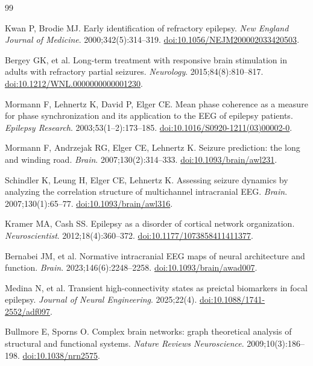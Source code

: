 \documentclass[a4paper,fleqn]{cas-dc}
\begin{document}
\begin{thebibliography}{99}

  Kwan P, Brodie MJ.
  Early identification of refractory epilepsy.
  \textit{New England Journal of Medicine}. 2000;342(5):314--319.
  \href{https://doi.org/10.1056/NEJM200002033420503}{doi:10.1056/NEJM200002033420503}.

  Bergey GK, et al.
  Long-term treatment with responsive brain stimulation in adults with
  refractory partial seizures.
  \textit{Neurology}. 2015;84(8):810--817.
  \href{https://doi.org/10.1212/WNL.0000000000001230}{doi:10.1212/WNL.0000000000001230}.

  Mormann F, Lehnertz K, David P, Elger CE.
  Mean phase coherence as a measure for phase synchronization and its
  application to the EEG of epilepsy patients.
  \textit{Epilepsy Research}. 2003;53(1--2):173--185.
  \href{https://doi.org/10.1016/S0920-1211(03)00002-0}{doi:10.1016/S0920-1211(03)00002-0}.

  Mormann F, Andrzejak RG, Elger CE, Lehnertz K.
  Seizure prediction: the long and winding road.
  \textit{Brain}. 2007;130(2):314--333.
  \href{https://doi.org/10.1093/brain/awl231}{doi:10.1093/brain/awl231}.

  Schindler K, Leung H, Elger CE, Lehnertz K.
  Assessing seizure dynamics by analyzing the correlation structure of
  multichannel intracranial EEG.
  \textit{Brain}. 2007;130(1):65--77.
  \href{https://doi.org/10.1093/brain/awl316}{doi:10.1093/brain/awl316}.

  Kramer MA, Cash SS.
  Epilepsy as a disorder of cortical network organization.
  \textit{Neuroscientist}. 2012;18(4):360--372.
  \href{https://doi.org/10.1177/1073858411411377}{doi:10.1177/1073858411411377}.

  Bernabei JM, et al.
  Normative intracranial EEG maps of neural architecture and function.
  \textit{Brain}. 2023;146(6):2248--2258.
  \href{https://doi.org/10.1093/brain/awad007}{doi:10.1093/brain/awad007}.

  Medina N, et al.
  Transient high-connectivity states as preictal biomarkers in focal
  epilepsy.
  \textit{Journal of Neural Engineering}. 2025;22(4).
  \href{https://doi.org/10.1088/1741-2552/adf097}{doi:10.1088/1741-2552/adf097}.

  Bullmore E, Sporns O.
  Complex brain networks: graph theoretical analysis of structural and
  functional systems.
  \textit{Nature Reviews Neuroscience}. 2009;10(3):186--198.
  \href{https://doi.org/10.1038/nrn2575}{doi:10.1038/nrn2575}.


\end{thebibliography}
\end{document}
